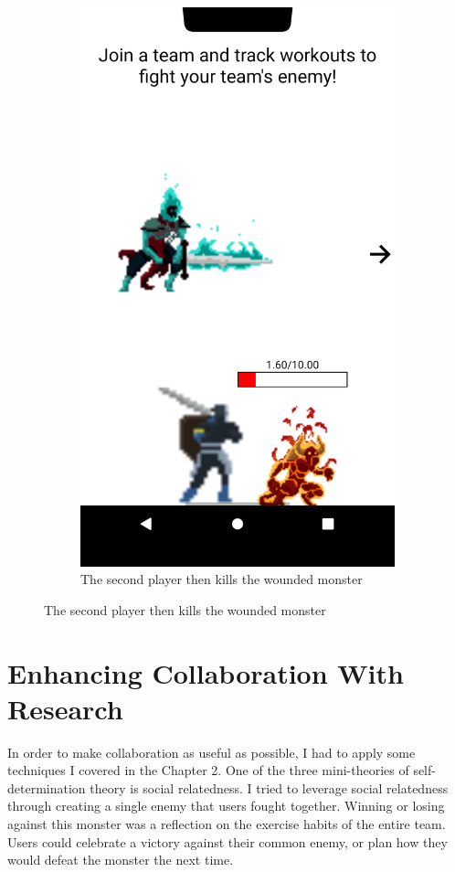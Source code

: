 \documentclass{l4proj}
\begin{document}
\begin{figure}[H]
\begin{subfigure}{0.45\textwidth}
        \includegraphics[width=\textwidth]{lower_attack.png}
        \caption{The second player then kills the wounded monster} 
    \end{subfigure}
\end{figure}

\section{Enhancing Collaboration With Research} \label{enhancing}
In order to make collaboration as useful as possible, I had to apply some techniques I covered in the Chapter 2. One of the three mini-theories of self-determination theory is social relatedness. I tried to leverage social relatedness through creating a single enemy that users fought together. Winning or losing against this monster was a reflection on the exercise habits of the entire team. Users could celebrate a victory against their common enemy, or plan how they would defeat the monster the next time.
\end{document}
